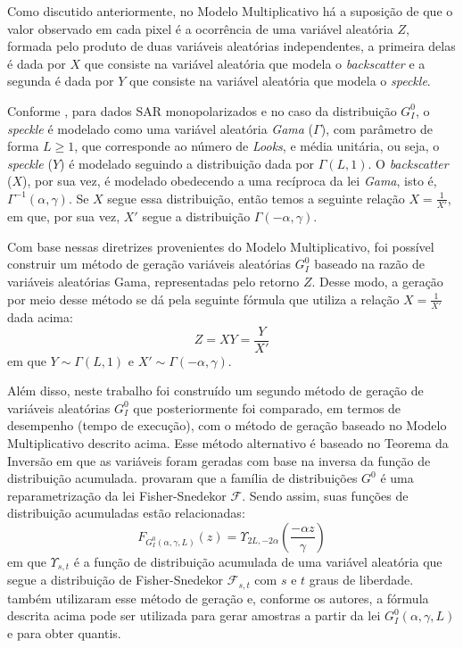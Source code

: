 Como discutido anteriormente, no Modelo Multiplicativo há a suposição de que o valor observado em cada pixel é a ocorrência de uma variável aleatória $Z$, formada pelo produto de duas variáveis aleatórias independentes, a primeira delas é dada por $X$ que consiste na variável aleatória que modela o \textit{backscatter} e a segunda é dada por $Y$ que consiste na variável aleatória que modela o \textit{speckle}.

Conforme \citet{FreryStochasticDistances2015}, para dados SAR monopolarizados e no caso da distribuição $G_I^0$, o \textit{speckle} é modelado como uma variável aleatória \textit{Gama} ($\Gamma$), com parâmetro de forma $L \geq 1$, que corresponde ao número de \textit{Looks}, e média unitária, ou seja, o \textit{speckle} ($Y$) é modelado seguindo a distribuição dada por $\Gamma(L,1)$.
O \textit{backscatter} ($X$), por sua vez, é modelado obedecendo a uma recíproca da lei \textit{Gama}, isto é, $\Gamma^{-1}(\alpha,\gamma)$. Se $X$ segue essa distribuição, então temos a seguinte relação $X = \frac{1}{{X}'}$, em que, por sua vez, ${X}'$  segue a distribuição $\Gamma(-\alpha, \gamma)$. 

Com base nessas diretrizes provenientes do Modelo Multiplicativo, foi possível construir um método de geração variáveis aleatórias $G_I^0$ baseado na razão de variáveis aleatórias Gama, representadas pelo retorno $Z$. Desse modo, a geração por meio desse método se dá pela seguinte fórmula que utiliza a relação $X = \frac{1}{{X}'}$ dada acima:
\begin{equation}
    Z = XY = \frac{Y}{X'}
\end{equation}
em que $Y \sim \Gamma(L,1)$ e $X' \sim \Gamma(-\alpha, \gamma)$. 

Além disso, neste trabalho foi construído um segundo método de geração de variáveis aleatórias $G_I^0$ que posteriormente foi comparado, em termos de desempenho (tempo de execução), com o método de geração baseado no Modelo Multiplicativo descrito acima.
Esse método alternativo é baseado no Teorema da Inversão em que as variáveis foram geradas com base na inversa da função de distribuição acumulada.
\citet{Mejail2002} provaram que a família de distribuições $G^0$ é uma reparametrização da lei Fisher-Snedekor $\mathcal{F}$. Sendo assim, suas funções de distribuição acumuladas estão relacionadas:
\begin{equation}
    F_{G_I^0(\alpha, \gamma, L)}(z) = \Upsilon_{2L,-2\alpha} \left ( \frac{-\alpha z}{\gamma} \right )
\end{equation}
em que $\Upsilon_{s,t}$ é a função de distribuição acumulada de uma variável aleatória que segue a distribuição de Fisher-Snedekor $\mathcal{F}_{s,t}$ com $s$ e $t$ graus de liberdade. \citet{SamplingfromtheGI0Distribution2018} também utilizaram esse método de geração e, conforme os autores, a fórmula descrita acima pode ser utilizada para gerar amostras a partir da lei $G_I^0(\alpha, \gamma, L)$ e para obter quantis.

